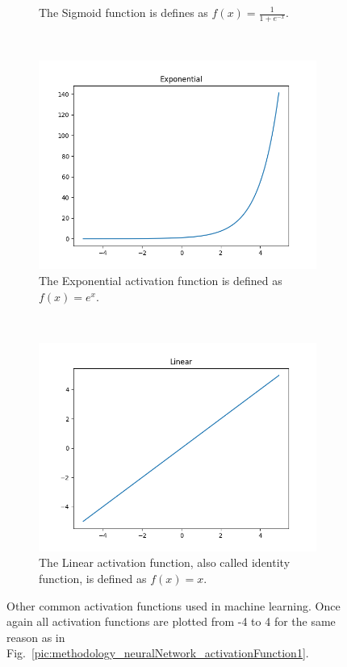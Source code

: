 \begin{figure}[h!]
\begin{subfigure}[t]{0.4\textwidth}
		\caption{The Sigmoid function is defines as $f(x) = \frac{1}{1 + e^{-x}}$.}
	\end{subfigure}
	~
	\begin{subfigure}[t]{0.4\textwidth}
		\centering
		\includegraphics[width=\textwidth]{img/methodology_neuralNetwork_activationFunction_exponential.png}
		\caption{The Exponential activation function is defined as $f(x) = e^x$.}
	\end{subfigure}%
	~ 
	\begin{subfigure}[t]{0.4\textwidth}
		\centering
		\includegraphics[width=\textwidth]{img/methodology_neuralNetwork_activationFunction_linear.png}
		\caption{The Linear activation function, also called identity function, is defined as $f(x) = x$.}
	\end{subfigure}
	\caption{Other common activation functions used in machine learning. Once again all activation functions are plotted from -4 to 4 for the same reason as in Fig.~\ref{pic:methodology_neuralNetwork_activationFunction1}.}
	\label{pic:methodology_neuralNetwork_activationFunction2}
\end{figure}


